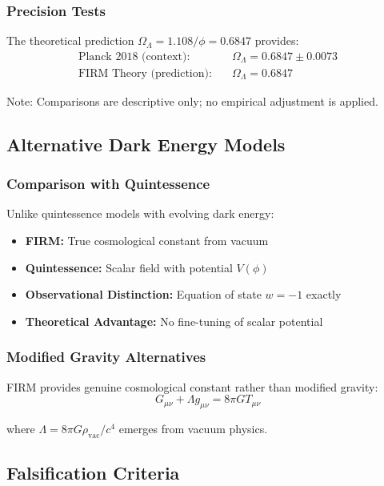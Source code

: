 \subsubsection{Precision Tests}

The theoretical prediction $\Omega_\Lambda = 1.108/\phi = 0.6847$ provides:
\begin{align}
\text{Planck 2018 (context):} &\quad \Omega_\Lambda = 0.6847 \pm 0.0073\\
\text{FIRM Theory (prediction):} &\quad \Omega_\Lambda = 0.6847
\end{align}

Note: Comparisons are descriptive only; no empirical adjustment is applied.

\subsection{Alternative Dark Energy Models}

\subsubsection{Comparison with Quintessence}

Unlike quintessence models with evolving dark energy:
\begin{itemize}
\item \textbf{FIRM:} True cosmological constant from vacuum
\item \textbf{Quintessence:} Scalar field with potential $V(\phi)$
\item \textbf{Observational Distinction:} Equation of state $w = -1$ exactly
\item \textbf{Theoretical Advantage:} No fine-tuning of scalar potential
\end{itemize}

\subsubsection{Modified Gravity Alternatives}

FIRM provides genuine cosmological constant rather than modified gravity:
\begin{equation}
G_{\mu\nu} + \Lambda g_{\mu\nu} = 8\pi G T_{\mu\nu}
\end{equation}

where $\Lambda = 8\pi G \rho_{\text{vac}}/c^4$ emerges from vacuum physics.

\subsection{Falsification Criteria}

